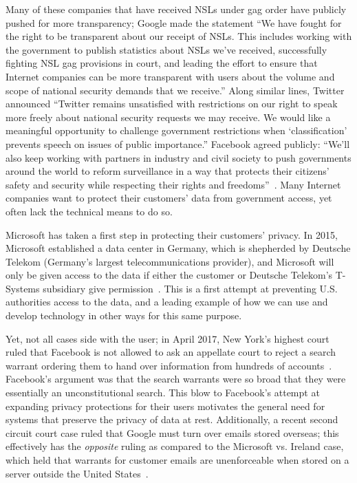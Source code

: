 Many of these companies that have received NSLs under gag order have publicly
pushed for more transparency; Google made the statement ``We have fought for
the right to be transparent about our receipt of NSLs. This includes working
with the government to publish statistics about NSLs we've received,
successfully fighting NSL gag provisions in court, and leading the effort to
ensure that Internet companies can be more transparent with users about the
volume and scope of national security demands that we receive.'' Along similar
lines, Twitter announced ``Twitter remains unsatisfied with restrictions on
our right to speak more freely about national security requests we may
receive. We would like a meaningful opportunity to challenge government
restrictions when ‘classification’ prevents speech on issues of public
importance.''  Facebook agreed publicly: ``We'll also keep working with
partners in industry and civil society to push governments around the world to
reform surveillance in a way that protects their citizens’ safety and security
while respecting their rights and freedoms''~\cite{cloudflare_gag}.  
Many Internet companies want to protect their customers' data from
government access, yet often lack the technical means to do so.

Microsoft has taken a first step in protecting their customers' privacy.  In
2015, Microsoft established a data center in Germany, which is shepherded by
Deutsche Telekom (Germany's largest telecommunications provider), and
Microsoft will only be given access to the data if either the customer or
Deutsche Telekom's T-Systems subsidiary give
permission~\cite{microsoft_germany}.  This is a first attempt at preventing
U.S. authorities access to the data, and a leading example of how we can use
and develop technology in other ways for this same purpose.

Yet, not all cases side with the user; in April 2017, New
York's highest court ruled that Facebook is not allowed to ask an appellate
court to reject a search warrant ordering them to hand over information from
hundreds of accounts~\cite{facebook_ny}.  Facebook's argument was that the
search warrants were so broad that they were essentially an unconstitutional
search.  This blow to Facebook's attempt at expanding privacy protections for
their users motivates the general need for systems that preserve the privacy
of data at rest.  Additionally, a recent second circuit court case ruled that
Google must turn over emails stored overseas; this effectively has the {\it
opposite} ruling as compared to the Microsoft vs. Ireland case, which held
that warrants for customer emails are unenforceable when stored on a server
outside the United States~\cite{google_overseas,microsoft_ireland}.

